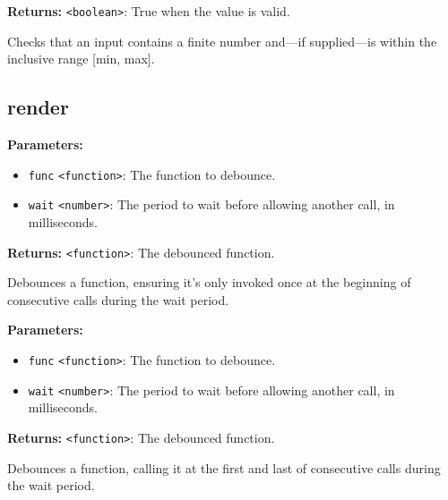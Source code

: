 \documentclass[12pt,a4paper]{article}
\begin{document}
\noindent \textbf{Returns:} \texttt{<boolean>}: True when the value is valid.

\noindent Checks that an input contains a finite number
and—if supplied—is within the inclusive range [min, max].


\subsection{render}
\vspace{5mm}
\noindent {}


\noindent \textbf{Parameters:}
\begin{itemize}
  \item \texttt{func} \texttt{<function>}: The function to debounce.
  \item \texttt{wait} \texttt{<number>}: The period to wait before allowing another call, in milliseconds.
\end{itemize}

\noindent \textbf{Returns:} \texttt{<function>}: The debounced function.

\noindent Debounces a function, ensuring it's only invoked once at the beginning of consecutive calls during the wait period.

\vspace{5mm}
\noindent {}


\noindent \textbf{Parameters:}
\begin{itemize}
  \item \texttt{func} \texttt{<function>}: The function to debounce.
  \item \texttt{wait} \texttt{<number>}: The period to wait before allowing another call, in milliseconds.
\end{itemize}

\noindent \textbf{Returns:} \texttt{<function>}: The debounced function.

\noindent Debounces a function, calling it at the first and last of consecutive calls during the wait period.

\vspace{5mm}
\noindent {}
\end{document}

